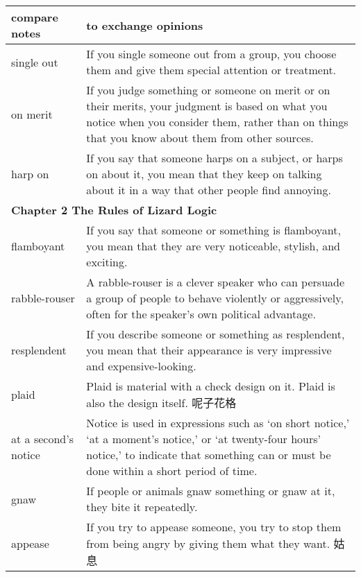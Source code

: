 \documentclass{article}
\begin{document}
\begin{center}
\begin{longtable}{|l|p{9cm}|}
\hline
compare notes
&
to exchange opinions
\\

\hline
single out
&
If you single someone out from a group, you choose them and give them special attention or treatment.
\\

\hline
on merit
&
If you judge something or someone on merit or on their merits, your judgment is based on what you notice when you consider them, rather than on things that you know about them from other sources.
\\

\hline
harp on
&
If you say that someone harps on a subject, or harps on about it, you mean that they keep on talking about it in a way that other people find annoying.
\\

\hline
\multicolumn{2}{|l|}{\textbf{Chapter 2 The Rules of Lizard Logic}}\\

\hline
flamboyant
&
If you say that someone or something is flamboyant, you mean that they are very noticeable, stylish, and exciting.
\\

\hline
rabble-rouser
&
A rabble-rouser is a clever speaker who can persuade a group of people to behave violently or aggressively, often for the speaker's own political advantage.
\\

\hline
resplendent
&
If you describe someone or something as resplendent, you mean that their appearance is very impressive and expensive-looking.
\\

\hline
plaid
&
Plaid is material with a check design on it. Plaid is also the design itself. 呢子花格
\\

\hline
at a second's notice
&
Notice is used in expressions such as `on short notice,' `at a moment's notice,' or `at twenty-four hours' notice,' to indicate that something can or must be done within a short period of time.
\\

\hline
gnaw
&
If people or animals gnaw something or gnaw at it, they bite it repeatedly.
\\

\hline
appease
&
If you try to appease someone, you try to stop them from being angry by giving them what they want. 姑息
\\


\end{longtable}
\end{center}
\end{document}
